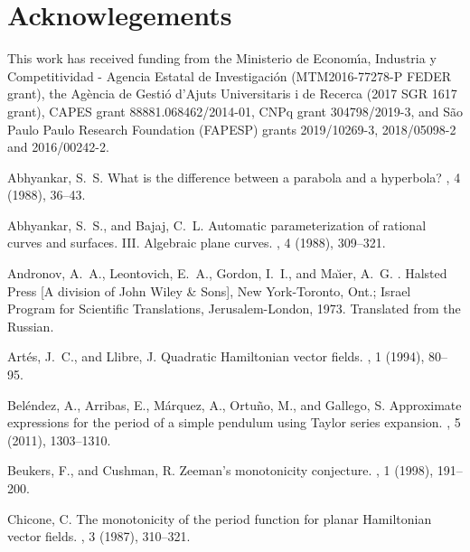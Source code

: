 \documentclass[12pt,a4paper,reqno]{amsart}
\begin{document}
\section*{Acknowlegements}


This work has received funding from the Ministerio de Econom\'{\i}a,
Industria y Competitividad - Agencia Estatal de Investigaci\'{o}n
(MTM2016-77278-P FEDER grant), the Ag\`{e}ncia de Gesti\'{o} d'Ajuts
Universitaris i de Recerca (2017 SGR 1617 grant), CAPES grant
88881.068462/2014-01, CNPq grant 304798/2019-3, and São Paulo Paulo Research Foundation (FAPESP) grants 2019/10269-3, 2018/05098-2 and 2016/00242-2.



%
%

\begin{thebibliography}{10}

{\sc Abhyankar, S.~S.}
\newblock What is the difference between a parabola and a hyperbola?
, 4 (1988), 36--43.

{\sc Abhyankar, S.~S., and Bajaj, C.~L.}
\newblock Automatic parameterization of rational curves and surfaces. {III}.
  {A}lgebraic plane curves.
, 4 (1988), 309--321.

{\sc Andronov, A.~A., Leontovich, E.~A., Gordon, I.~I., and
Ma\u{\i}er, A.~G.}
.
\newblock Halsted Press [A division of John Wiley \& Sons], New York-Toronto,
  Ont.; Israel Program for Scientific Translations, Jerusalem-London, 1973.
\newblock Translated from the Russian.

{\sc Art\'{e}s, J.~C., and Llibre, J.}
\newblock Quadratic {H}amiltonian vector fields.
, 1 (1994), 80--95.

{\sc Bel\'{e}ndez, A., Arribas, E., M\'{a}rquez, A., Ortu\~{n}o, M., and
Gallego, S.}
\newblock  Approximate expressions for the period of a simple pendulum using
{T}aylor series expansion. , 5
(2011), 1303--1310.

{\sc Beukers, F., and Cushman, R.}
\newblock Zeeman's monotonicity conjecture.
, 1 (1998), 191--200.

{\sc Chicone, C.}
\newblock The monotonicity of the period function for planar {H}amiltonian
  vector fields.
, 3 (1987), 310--321.


\end{thebibliography}
\end{document}
